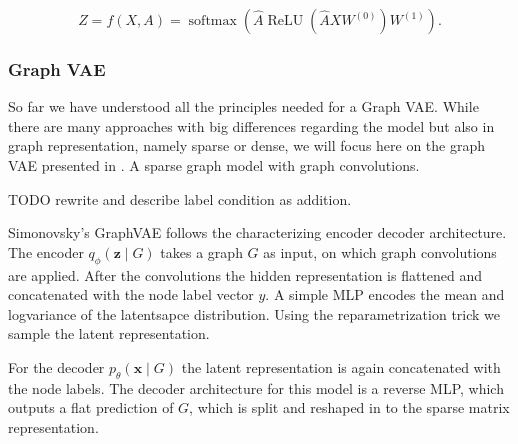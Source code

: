 \begin{equation}
    Z=f(X, A)=\operatorname{softmax}\left(\hat{A} \operatorname{ReLU}\left(\hat{A} X W^{(0)}\right) W^{(1)}\right).
\end{equation}




\subsubsection{Graph VAE}
\label{ssec:GVAE}

So far we have understood all the principles needed for a Graph VAE. While there are many approaches with big differences regarding the model but also in graph representation, namely sparse or dense, we will focus here on the graph VAE presented in \cite{simonovsky_graphvae_2018}. A sparse graph model with graph convolutions.

TODO rewrite and describe label condition as addition.

Simonovsky's GraphVAE  follows the characterizing encoder decoder architecture.
The encoder $q_{\phi}(\mathbf{z} \mid {G})$ takes a graph ${G}$ as input, on which graph convolutions are applied. After the convolutions the hidden representation is flattened and concatenated with the node label vector $y$. A simple MLP encodes the mean and logvariance of the latentsapce distribution. Using the reparametrization trick we sample the latent representation.

For the decoder $p_{\theta}(\mathbf{x} \mid {G})$ the latent representation is again concatenated with the node labels. The decoder architecture for this model is a reverse MLP, which outputs a flat prediction of ${G}$, which is split and reshaped in to the sparse matrix representation.

